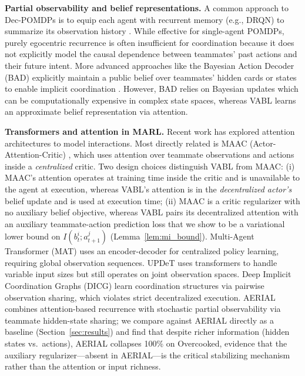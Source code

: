 \documentclass{article}
\theoremstyle{plain}
\theoremstyle{definition}
\theoremstyle{remark}
\begin{document}
\textbf{Partial observability and belief representations.}
A common approach to Dec-POMDPs is to equip each agent with recurrent memory (e.g., DRQN) to summarize its observation history \cite{hausknecht2015deep}. While effective for single-agent POMDPs, purely egocentric recurrence is often insufficient for coordination because it does not explicitly model the causal dependence between teammates' past actions and their future intent. More advanced approaches like the Bayesian Action Decoder (BAD) explicitly maintain a public belief over teammates' hidden cards or states to enable implicit coordination \cite{foerster2019bad}. However, BAD relies on Bayesian updates which can be computationally expensive in complex state spaces, whereas VABL learns an approximate belief representation via attention.

\textbf{Transformers and attention in MARL.}
Recent work has explored attention architectures to model interactions. Most directly related is MAAC (Actor-Attention-Critic) \cite{iqbal2019actor}, which uses attention over teammate observations and actions inside a \emph{centralized} critic. Two design choices distinguish VABL from MAAC: (i) MAAC's attention operates at training time inside the critic and is unavailable to the agent at execution, whereas VABL's attention is in the \emph{decentralized actor's} belief update and is used at execution time; (ii) MAAC is a critic regularizer with no auxiliary belief objective, whereas VABL pairs its decentralized attention with an auxiliary teammate-action prediction loss that we show to be a variational lower bound on $I(b_t^i; a_{t+1}^j)$ (Lemma~\ref{lem:mi_bound}). Multi-Agent Transformer (MAT) \cite{wen2022mat} uses an encoder-decoder for centralized policy learning, requiring global observation sequences. UPDeT \cite{hu2021updet} uses transformers to handle variable input sizes but still operates on joint observation spaces. Deep Implicit Coordination Graphs (DICG) \cite{li2020deep} learn coordination structures via pairwise observation sharing, which violates strict decentralized execution. AERIAL \cite{phan2023attention} combines attention-based recurrence with stochastic partial observability via teammate hidden-state sharing; we compare against AERIAL directly as a baseline (Section~\ref{sec:results}) and find that despite richer information (hidden states vs.\ actions), AERIAL collapses 100\% on Overcooked, evidence that the auxiliary regularizer---absent in AERIAL---is the critical stabilizing mechanism rather than the attention or input richness.
\end{document}
